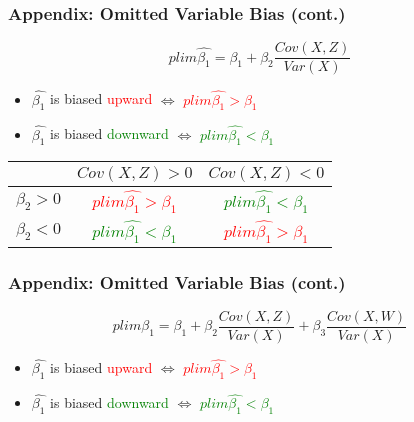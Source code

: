 \documentclass[11pt, xcolor=x11names,compress]{beamer}
\begin{document}
\begin{frame}[fragile,t]
\frametitle{Appendix: Omitted Variable Bias (cont.)}\label{OVB}
\begin{equation*}
    plim\hat{\beta_1} = \beta_1 + \beta_2\frac{Cov(X,Z)}{Var(X)}
\end{equation*}

\begin{itemize}
    \item $\hat{\beta_1}$ is biased \textcolor{red}{upward} \hspace{3mm} $\Leftrightarrow$ \textcolor{red}{$plim\hat{\beta_1} > \beta_1$}
    \item $\hat{\beta_1}$ is biased \textcolor{green}{downward} $\Leftrightarrow$ \textcolor{green}{$plim\hat{\beta_1} < \beta_1$}
\end{itemize}

\vspace{3mm}

\begin{center}
\setlength{\tabcolsep}{3pt}
\begin{tabular}{|c|c|c|}
\hline
& $Cov(X,Z) > 0$ & $Cov(X,Z) < 0$
\\
\hline
$\beta_2 > 0$ & \textcolor{red}{$plim\hat{\beta_1} > \beta_1$}  & \textcolor{green}{$plim\hat{\beta_1} < \beta_1$} \\
 \hline 
$\beta_2 < 0$ & \textcolor{green}{$plim\hat{\beta_1} < \beta_1$} & \textcolor{red}{$plim\hat{\beta_1} > \beta_1$}
\\ \hline
\end{tabular}
\end{center}
\hyperlink{OVBb}{}
 \end{frame}

\begin{frame}[fragile,t]
\frametitle{Appendix: Omitted Variable Bias (cont.)}\label{OVB}
\begin{equation*}
    plim\hat{\beta_1} = \beta_1 + \beta_2\frac{Cov(X,Z)}{Var(X)} + \beta_3\frac{Cov(X,W)}{Var(X)}
\end{equation*}

\begin{itemize}
    \item $\hat{\beta_1}$ is biased \textcolor{red}{upward} \hspace{3mm} $\Leftrightarrow$ \textcolor{red}{$plim\hat{\beta_1} > \beta_1$}
    \item $\hat{\beta_1}$ is biased \textcolor{green}{downward} $\Leftrightarrow$ \textcolor{green}{$plim\hat{\beta_1} < \beta_1$}
\end{itemize}
 \end{frame}
\end{document}
